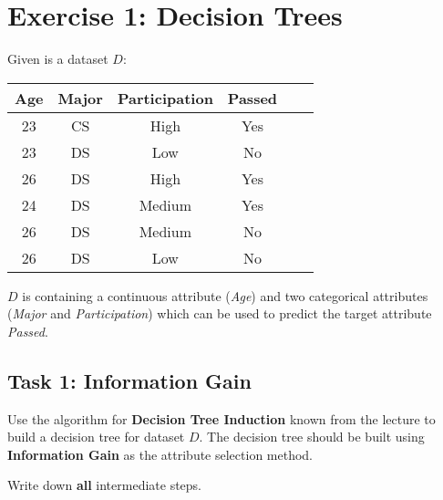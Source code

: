 \documentclass[
english,
smallborders
]{i6prcsht}
\begin{document}
\section*{Exercise 1: Decision Trees}

Given is a dataset $D$:

\begin{center}
	\begin{tabular}{|c|c|c|c|c|c|}
		\hline
		\textbf{Age} & \textbf{Major} & \textbf{Participation} & \textbf{Passed} \\ \hline
		23           & CS             & High                   & Yes             \\ \hline
		23           & DS             & Low                    & No              \\ \hline
		26           & DS             & High                   & Yes             \\ \hline
		24           & DS             & Medium                 & Yes             \\ \hline
		26           & DS             & Medium                 & No              \\ \hline
		26           & DS             & Low                    & No              \\ \hline
	\end{tabular}
\end{center}

$D$ is containing a continuous attribute (\textit{Age}) and two categorical attributes (\textit{Major} and \textit{Participation}) which can be used to predict the target attribute \textit{Passed}.

\subsection*{Task 1: Information Gain}

Use the algorithm for \textbf{Decision Tree Induction} known from the lecture to build a decision tree for dataset $D$. The decision tree should be built using \textbf{Information Gain} as the attribute selection method.

Write down \textbf{all} intermediate steps.
\end{document}
